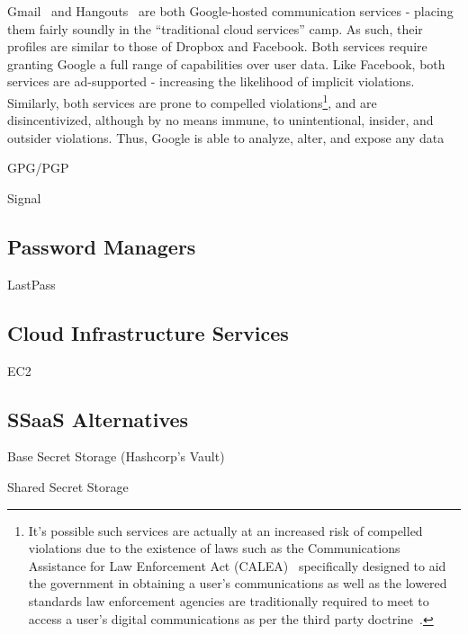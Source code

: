 Gmail~\cite{google-gmail} and Hangouts~\cite{google-hangouts} are both
Google-hosted communication services - placing them fairly soundly in
the ``traditional cloud services'' camp. As such, their profiles are
similar to those of Dropbox and Facebook. Both services require
granting Google a full range of capabilities over user data. Like
Facebook, both services are ad-supported - increasing the likelihood
of implicit violations. Similarly, both services are prone to
compelled violations\footnote{It's possible such services are actually
  at an increased risk of compelled violations due to the existence of
  laws such as the Communications Assistance for Law Enforcement Act
  (CALEA)~\cite{calea-usc, calea-fcc} specifically designed to aid the
  government in obtaining a user's communications as well as the
  lowered standards law enforcement agencies are traditionally
  required to meet to access a user's digital communications as per
  the third party doctrine~\cite{scotus-usvmiller,
    scotus-smithvmaryland}.}, and are disincentivized, although by no
means immune, to unintentional, insider, and outsider
violations. Thus, Google is able to analyze, alter, and expose any
data

GPG/PGP

Signal


\subsection{Password Managers}

LastPass

\subsection{Cloud Infrastructure Services}

EC2

\subsection{SSaaS Alternatives}

Base Secret Storage (Hashcorp's Vault)

Shared Secret Storage

